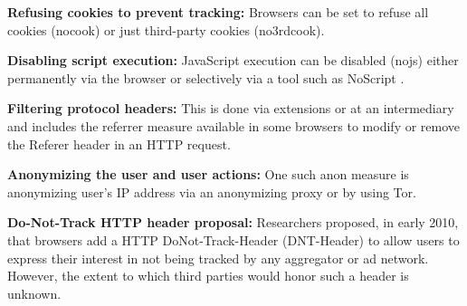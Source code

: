 \textbf{Refusing cookies to prevent tracking:}
Browsers can be set to refuse all cookies (nocook) or just third-party cookies (no3rdcook).

\textbf{Disabling script execution:}
JavaScript execution can be disabled (nojs) either permanently via the browser or selectively via a tool such as NoScript \cite{NoScript}.

\textbf{Filtering protocol headers:}
This is done via extensions or at an intermediary and includes the referrer measure available in some browsers to modify or remove the Referer header in an HTTP request.

\textbf{Anonymizing the user and user actions:} One such anon measure is anonymizing user’s IP address via an anonymizing proxy or by using Tor.

\textbf{Do-Not-Track HTTP header proposal:}
Researchers proposed,
	in early 2010,
	that browsers add a HTTP DoNot-Track-Header (DNT-Header) \cite{mayer-do-not-track-00} to allow users to express their interest in not being tracked by any aggregator or ad network.
However,
	the extent to which third parties would honor such a header is unknown.


